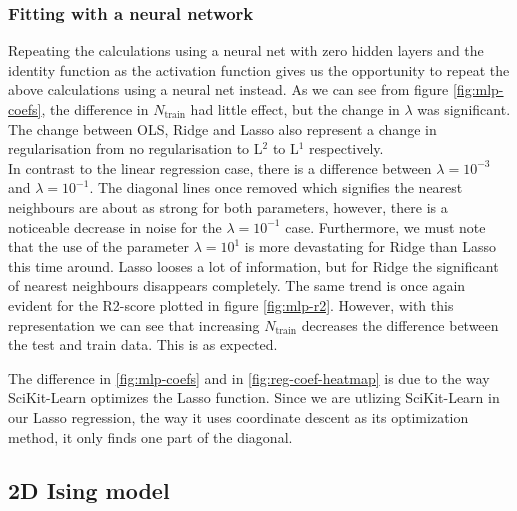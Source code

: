 \documentclass[11pt]{article}
\begin{document}
\subsubsection{Fitting with a neural network}
Repeating the calculations using a neural net with zero hidden layers and the identity function as the activation function gives us the opportunity to repeat the above calculations using a neural net instead. As we can see from figure \ref{fig:mlp-coefs}, the difference in $N_{\text{train}}$ had little effect, but the change in $\lambda$ was significant. The change between OLS, Ridge and Lasso also represent a change in regularisation from no regularisation to L$^2$ to L$^1$ respectively. \\
In contrast to the linear regression case, there is a difference between $\lambda = 10^{-3}$ and $\lambda = 10^{-1}$. The diagonal lines once removed which signifies the nearest neighbours are about as strong for both parameters, however, there is a noticeable decrease in noise for the $\lambda = 10^{-1}$ case. Furthermore, we must note that the use of the parameter $\lambda = 10^{1}$ is more devastating for Ridge than Lasso this time around. Lasso looses a lot of information, but for Ridge the significant of nearest neighbours disappears completely. The same trend is once again evident for the R2-score plotted in figure \ref{fig:mlp-r2}. However, with this representation we can see that increasing $N_{\text{train}}$ decreases the difference between the test and train data. This is as expected.

The difference in \ref{fig:mlp-coefs} and in \ref{fig:reg-coef-heatmap} is due to the way SciKit-Learn optimizes the Lasso function. Since we are utlizing SciKit-Learn in our Lasso regression, the way it uses coordinate descent as its optimization method, it only finds one part of the diagonal.
\subsection{2D Ising model}
\end{document}
